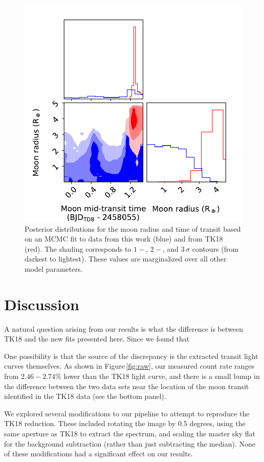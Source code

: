 \documentclass[twocolumn]{aastex62}
\begin{document}

\begin{figure}
\includegraphics[width = 0.5 \textwidth]{figures/fig5_pairs.pdf}
    \caption{Posterior distributions for the moon radius and time of transit based on an MCMC fit to data from this work (blue) and from TK18 (red). The shading corresponds to $1-$, $2-$, and $3\,\sigma$ contours (from darkest to lightest). These values are marginalized over all other model parameters.} 
\label{fig:corner}
\end{figure}

\section{Discussion}
A natural question arising from our results is what the difference is between TK18 and the new fits presented here. Since we found that

One possibility is that the source of the discrepancy is the extracted transit light curves themselves. As shown in Figure\,\ref{fig:raw}, our measured count rate ranges from $2.46 -2.74\%$ lower than the TK18 light curve, and there is a small bump in the difference between the two data sets near the location of the moon transit identified in the TK18 data (see the bottom panel).

 We explored several modifications to our pipeline to attempt to reproduce the TK18 reduction. These included rotating the image by 0.5 degrees, using the same aperture as TK18 to extract the spectrum, and scaling the master sky flat for the background subtraction (rather than just subtracting the median). None of these modifications had a significant effect on our results. 
\end{document}
